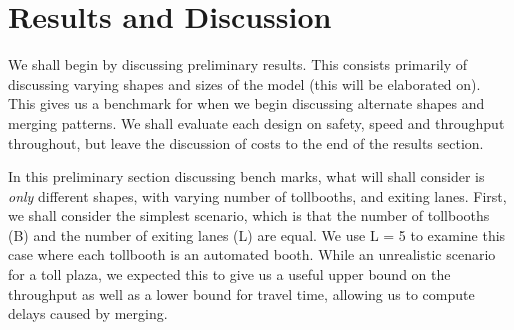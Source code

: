 \documentclass[a4paper, 11pt]{article}
\begin{document}
\section{Results and Discussion}
\label{results}


We shall begin by discussing preliminary results. This consists primarily of discussing varying shapes and sizes of the model (this will be elaborated on). This gives us a benchmark for when we begin discussing alternate shapes and merging patterns. We shall evaluate each design on safety, speed and throughput throughout, but leave the discussion of costs to the end of the results section.

In this preliminary section discussing bench marks, what will shall consider is \textit{only} different shapes, with varying number of tollbooths, and exiting lanes. First, we shall consider the simplest scenario, which is that the number of tollbooths (B) and the number of exiting lanes (L) are equal. We use L = 5 to examine this case where each tollbooth is an automated booth. While an unrealistic scenario for a toll plaza, we expected this to give us a useful upper bound on the throughput as well as a lower bound for travel time, allowing us to compute delays caused by merging.
\end{document}

